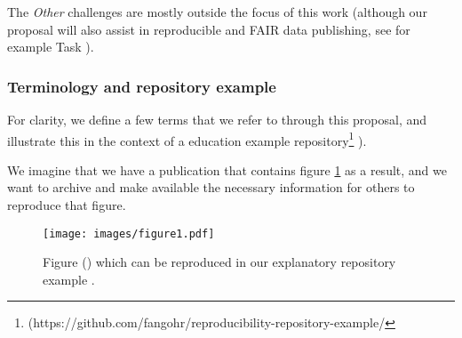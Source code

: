 The \emph{Other} challenges are mostly outside the focus of this work
(although our proposal will also assist in reproducible and FAIR data
publishing, see for example Task ).


\subsubsection{Terminology and repository example}\label{sec:terminology-and-repository-example}

For clarity, we define a few terms that we refer to through this proposal, and
illustrate this in the context of a education example repository\footnote{
(https://github.com/fangohr/reproducibility-repository-example/}
\cite{ReproducibilityRepositoryExample2022}).

We imagine that we have a publication that contains figure
\ref{fig:reproducibility-example-covid} as a result, and we want to archive and
make available the necessary information for others to reproduce that figure.

\begin{figure}
  \centering
  \texttt{[image: images/figure1.pdf]}
  \caption{Figure () which can be reproduced in our explanatory repository example
    \cite{ReproducibilityRepositoryExample2022}. \label{fig:reproducibility-example-covid}}
\end{figure}

